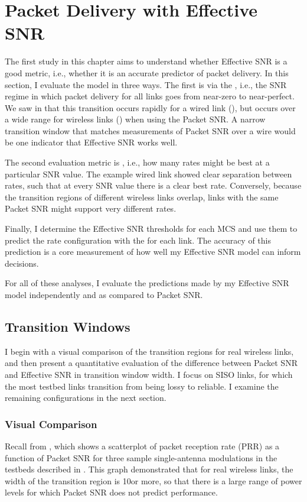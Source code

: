 \section{Packet Delivery with Effective SNR}
The first study in this chapter aims to understand whether Effective SNR is a good metric, i.e., whether it is an accurate predictor of packet delivery. In this section, I evaluate the model in three ways. The first is via the , i.e., the SNR regime in which packet delivery for all links goes from near-zero to near-perfect. We saw in  that this transition occurs rapidly for a wired link (), but occurs over a wide range for wireless links () when using the Packet SNR. A narrow transition window that matches measurements of Packet SNR over a wire would be one indicator that Effective SNR works well.

The second evaluation metric is , i.e., how many rates might be best at a particular SNR value. The example wired link showed clear separation between rates, such that at every SNR value there is a clear best rate. Conversely, because the transition regions of different wireless links overlap, links with the same Packet SNR might support very different rates. 

Finally, I determine the Effective SNR thresholds for each MCS and use them to predict the rate configuration with the  for each link. The accuracy of this prediction is a core measurement of how well my Effective SNR model can inform decisions.

For all of these analyses, I evaluate the predictions made by my Effective SNR model independently and as compared to Packet SNR.

\subsection{Transition Windows}
\label{sec:delivery_transition}
I begin with a visual comparison of the transition regions for real wireless links, and then present a quantitative evaluation of the difference between Packet SNR and Effective SNR in transition window width. I focus on SISO links, for which the most testbed links transition from being lossy to reliable. I examine the remaining configurations in the next section.

\subsubsection{Visual Comparison}
Recall  from , which shows a scatterplot of packet reception rate (PRR) as a function of Packet SNR for three sample single-antenna modulations in the testbeds described in . This graph demonstrated that for real wireless links, the width of the transition region is 10\dB or more, so that there is a large range of power levels for which Packet SNR does not predict performance.

